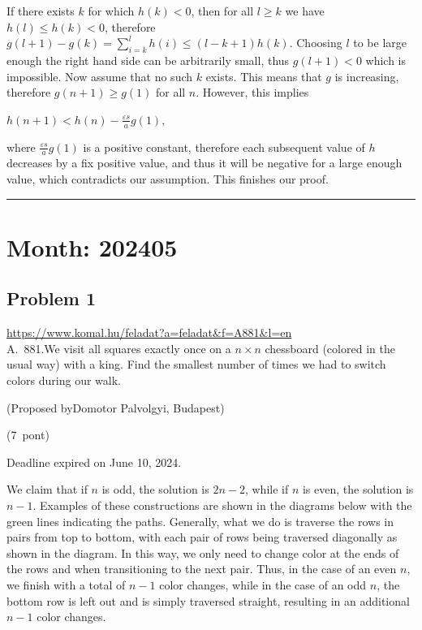 \documentclass{article}
\begin{document}
If there exists \(\displaystyle k\) for which \(\displaystyle h(k)<0\), then for all \(\displaystyle l\ge k\) we  have \(\displaystyle h(l)\le h(k) < 0\), therefore \(\displaystyle g(l+1)-g(k)=\sum_{i=k}^{l} h(i)\le (l-k+1)h(k)\). Choosing \(\displaystyle l\) to be large enough the right hand side can be arbitrarily small, thus \(\displaystyle g(l+1)<0\) which is impossible. Now assume that no such \(\displaystyle k\) exists. This means that \(\displaystyle g\) is increasing, therefore \(\displaystyle g(n+1)\ge g(1)\) for all \(\displaystyle n\). However, this implies

\(\displaystyle 
h(n+1)<h(n)-\frac{\varepsilon s}{a}g(1),
\)

where \(\displaystyle \frac{\varepsilon s}{a}g(1)\) is a positive constant, therefore each subsequent value of \(\displaystyle h\) decreases by a fix positive value, and thus it will be negative for a large enough value, which contradicts our assumption. This finishes our proof.

\vspace{1em}
\hrule
\vspace{1em}

\section*{Month: 202405}

\subsection*{Problem 1}
\noindent\url{https://www.komal.hu/feladat?a=feladat&f=A881&l=en}\\[1em]

A. 881.We visit all squares exactly once on a \(\displaystyle n\times n\) chessboard (colored in the usual way) with a king. Find the smallest number of times we had to switch colors during our walk.

(Proposed byDomotor Palvolgyi, Budapest)

(7 pont)

Deadline expired on June 10, 2024.

We claim that if \(\displaystyle n\) is odd, the solution is \(\displaystyle 2n-2\), while if \(\displaystyle n\) is even, the solution is \(\displaystyle n-1\). Examples of these constructions are shown in the diagrams below with the green lines indicating the paths. Generally, what we do is traverse the rows in pairs from top to bottom, with each pair of rows being traversed diagonally as shown in the diagram. In this way, we only need to change color at the ends of the rows and when transitioning to the next pair. Thus, in the case of an even \(\displaystyle n\), we finish with a total of \(\displaystyle n-1\) color changes, while in the case of an odd \(\displaystyle n\), the bottom row is left out and is simply traversed straight, resulting in an additional \(\displaystyle n-1\) color changes.
\end{document}
